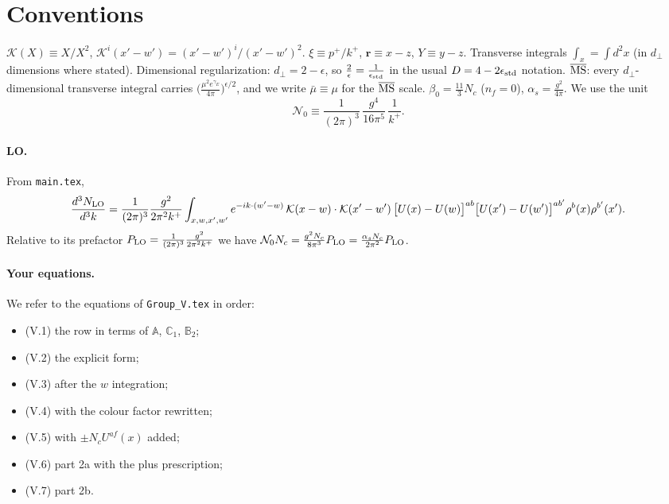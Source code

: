 \documentclass[10pt]{article}
\numberwithin{equation}{section}
\newcommand{\KK}{\mathcal K}
\newcommand{\Nz}{\mathcal N_0}
\newcommand{\mub}{\bar\mu}
\newcommand{\ve}{\epsilon}
\def\mf#1{\mathbb{#1}}
\begin{document}
\section{Conventions}\label{sec:conv}
$\KK(X)\equiv X/X^2$, $\KK^i(x'-w')=(x'-w')^i/(x'-w')^2$. $\xi\equiv p^+/k^+$, $\mathbf r\equiv x-z$, $Y\equiv y-z$. Transverse integrals $\int_x=\int d^2x$ (in $d_\perp$ dimensions where stated). Dimensional regularization: $d_\perp=2-\ve$, so $\frac2\ve=\frac{1}{\ve_{\rm std}}$ in the usual $D=4-2\ve_{\rm std}$ notation. $\overline{\rm MS}$: every $d_\perp$-dimensional transverse integral carries $\big(\frac{\mu^2e^{\gamma_E}}{4\pi}\big)^{\ve/2}$, and we write $\mub\equiv\mu$ for the $\overline{\rm MS}$ scale. $\beta_0=\frac{11}{3}N_c$ ($n_f=0$), $\alpha_s=\frac{g^2}{4\pi}$. We use the unit
\begin{equation}
\Nz\equiv\frac{1}{(2\pi)^3}\,\frac{g^4}{16\pi^5}\,\frac{1}{k^+}.
\end{equation}
\paragraph{LO.} From \texttt{main.tex},
\begin{equation}
\frac{d^3N_{\rm LO}}{d^3k}=\frac{1}{(2\pi)^3}\frac{g^2}{2\pi^2k^+}\int_{x,w,x',w'}e^{-ik\cdot(w'-w)}\,\KK(x-w)\cdot\KK(x'-w')\,\big[U(x)-U(w)\big]^{ab}\big[U(x')-U(w')\big]^{ab'}\rho^b(x)\rho^{b'}(x').
\label{eq:LO}
\end{equation}
Relative to its prefactor $P_{\rm LO}=\frac{1}{(2\pi)^3}\frac{g^2}{2\pi^2k^+}$ we have $\Nz N_c=\frac{g^2N_c}{8\pi^3}P_{\rm LO}=\frac{\alpha_sN_c}{2\pi^2}P_{\rm LO}$.

\paragraph{Your equations.} We refer to the equations of \texttt{Group\_V.tex} in order:
\begin{itemize}
\item (V.1) the row in terms of $\mf A$, $\mf C_1$, $\mf B_2$;
\item (V.2) the explicit form;
\item (V.3) after the $w$ integration;
\item (V.4) with the colour factor rewritten;
\item (V.5) with $\pm N_cU^{af}(x)$ added;
\item (V.6) part 2a with the plus prescription;
\item (V.7) part 2b.
\end{itemize}
\end{document}
